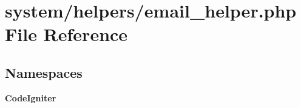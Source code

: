 \section{system/helpers/email\-\_\-helper.php File Reference}
\label{email__helper_8php}
\subsection*{Namespaces}
\begin{DoxyCompactItemize}
\item 
{\bf Code\-Igniter}
\end{DoxyCompactItemize}

